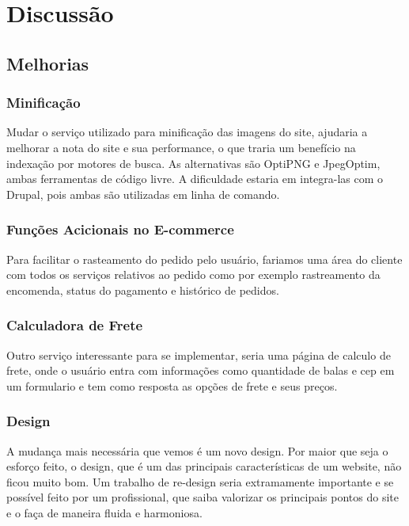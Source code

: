 \chapter{Discussão}



\section{Melhorias}

\subsection{Minificação}
Mudar o serviço utilizado para minificação das imagens do site, ajudaria a melhorar a nota do site e sua performance, o que traria um benefício na indexação por motores de busca. As alternativas são OptiPNG e JpegOptim, ambas ferramentas de código livre. A dificuldade estaria em integra-las com o Drupal, pois ambas são utilizadas em linha de comando.

\subsection{Funções Acicionais no E-commerce}
Para facilitar o rasteamento do pedido pelo usuário, fariamos uma área do cliente com todos os serviços relativos ao pedido como por exemplo rastreamento da encomenda, status do pagamento e histórico de pedidos.

\subsection{Calculadora de Frete}
Outro serviço interessante para se implementar, seria uma página de calculo de frete, onde o usuário entra com informações como quantidade de balas e cep em um formulario e tem como resposta as opções de frete e seus preços.

\subsection{Design}
A mudança mais necessária que vemos é um novo design. Por maior que seja o esforço feito, o design, que é um das principais características de um website, não ficou muito bom. Um trabalho de re-design seria extramamente importante e se possível feito por um profissional, que saiba valorizar os principais pontos do site e o faça de maneira fluida e harmoniosa.
